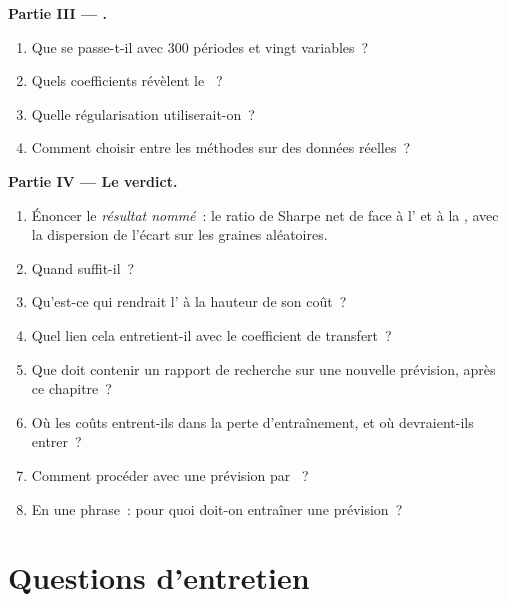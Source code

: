 \begin{problem}
\medskip\noindent\textbf{Partie III --- .}
\begin{enumerate}[resume]
\item Que se passe-t-il avec 300 périodes et vingt variables~?
\item Quels coefficients révèlent le ~?
\item Quelle régularisation utiliserait-on~?
\item Comment choisir entre les méthodes sur des données réelles~?
\end{enumerate}

\medskip\noindent\textbf{Partie IV --- Le verdict.}
\begin{enumerate}[resume]
\item Énoncer le \emph{résultat nommé}~: le ratio de Sharpe net de  face à l' et à la
, avec la dispersion de l'écart sur les graines aléatoires.
\item Quand  suffit-il~?
\item Qu'est-ce qui rendrait l' à la hauteur de son coût~?
\item Quel lien cela entretient-il avec le coefficient de transfert~?
\item Que doit contenir un rapport de recherche sur une nouvelle prévision, après ce chapitre~?
\item Où les coûts entrent-ils dans la perte d'entraînement, et où devraient-ils entrer~?
\item Comment procéder avec une prévision par ~?
\item En une phrase~: pour quoi doit-on entraîner une prévision~?
\end{enumerate}
\end{problem}

\section{Questions d'entretien}


